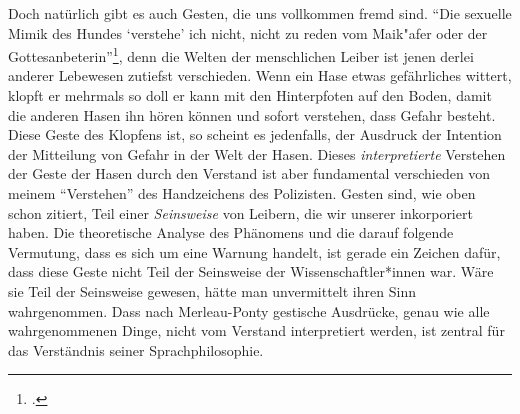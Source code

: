 \documentclass[a4paper, 12pt]{article}
\begin{document}
\begin{onehalfspace}
Doch natürlich gibt es auch Gesten, die uns vollkommen fremd sind. "`Die sexuelle Mimik des Hundes `verstehe' ich nicht, nicht zu reden vom Maik"afer oder der Gottesanbeterin"'\footnote{\Cite[Siehe][S. 219]{merleau1966phanomenologie}.}, denn die Welten der menschlichen Leiber ist jenen derlei anderer Lebewesen zutiefst verschieden. Wenn ein Hase etwas gefährliches wittert, klopft er mehrmals so doll er kann mit den Hinterpfoten auf den Boden, damit die anderen Hasen ihn hören können und sofort verstehen, dass Gefahr besteht. Diese Geste des Klopfens ist, so scheint es jedenfalls, der Ausdruck der Intention der Mitteilung von Gefahr in der Welt der Hasen. Dieses \emph{interpretierte} Verstehen der Geste der Hasen durch den Verstand ist aber fundamental verschieden von meinem "`Verstehen"' des Handzeichens des Polizisten. Gesten sind, wie oben schon zitiert, Teil einer \emph{Seinsweise} von Leibern, die wir unserer inkorporiert haben. Die theoretische Analyse des Phänomens und die darauf folgende Vermutung, dass es sich um eine Warnung handelt, ist gerade ein Zeichen dafür, dass diese Geste nicht Teil der Seinsweise der Wissenschaftler*innen war. Wäre sie Teil der Seinsweise gewesen, hätte man unvermittelt ihren Sinn wahrgenommen. Dass nach Merleau-Ponty gestische Ausdrücke, genau wie alle wahrgenommenen Dinge, nicht vom Verstand interpretiert werden, ist zentral für das Verständnis seiner Sprachphilosophie. 


\end{onehalfspace}
\end{document}
